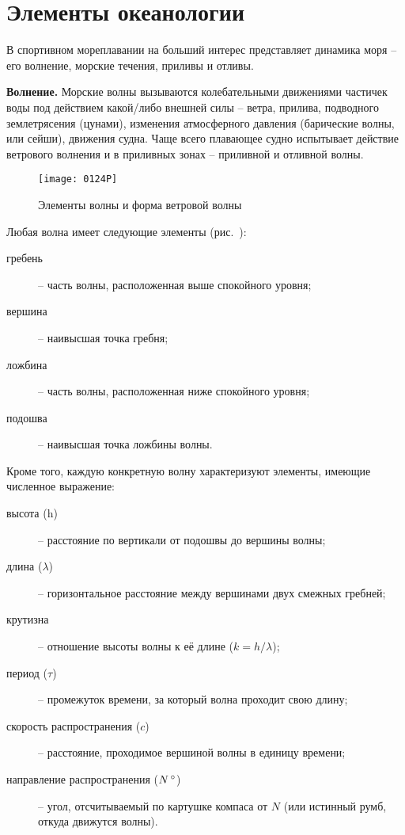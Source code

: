 \clearpage

\clearpage

\section{Элементы океанологии}

В спортивном мореплавании на больший интерес представляет динамика
моря \--- его волнение, морские течения, приливы и отливы.

\textbf{Волнение.} Морские волны вызываются
колебательными движениями частичек воды под действием какой\-/либо
внешней силы \--- ветра, прилива, подводного землетрясения (цунами),
изменения атмосферного давления (барические волны,
или сейши), движения судна. Чаще всего плавающее судно
испытывает действие ветрового волнения и в приливных зонах \---
приливной и отливной волны.

\begin{figure}[htb]
  \centering{}
  \texttt{[image: 0124P]}
  \caption{Элементы волны и форма ветровой волны}
  \label{fig:124}
\end{figure}

Любая волна имеет следующие элементы (рис.~):
\begin{description}
\item[гребень] \--- часть волны, расположенная выше спокойного уровня;
\item[вершина] \--- наивысшая точка гребня;
\item[ложбина] \--- часть волны, расположенная ниже спокойного уровня;
\item[подошва] \--- наивысшая точка ложбины волны.
\end{description}

Кроме того, каждую конкретную волну характеризуют элементы, имеющие
численное выражение:
\begin{description}
\item[высота (h)] \--- расстояние по вертикали от подошвы до вершины
  волны;
\item[длина ($\lambda$)] \--- горизонтальное расстояние между
  вершинами двух смежных гребней;
\item[крутизна] \--- отношение высоты волны к её длине
  ($k = h / \lambda$);
\item[период ($\tau$)] \--- промежуток времени, за который волна
  проходит свою длину;
\item[скорость распространения ($c$)] \--- расстояние, проходимое
  вершиной волны в единицу времени;
\item[направление распространения ($N\,^\circ$)] \--- угол, отсчитываемый
  по картушке компаса от $N$ (или истинный румб, откуда движутся
  волны).
\end{description}

